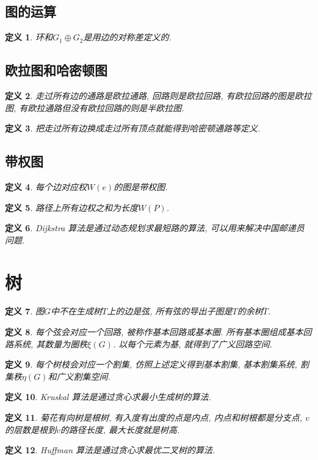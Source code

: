 \documentclass[UTF8,a4paper,11pt]{ctexart}
\newtheorem{definition}{定义}
\begin{document}
    \subsection{图的运算}
      \begin{definition}
        环和$G_1\oplus G_2$是用边的对称差定义的.
      \end{definition}
    \subsection{欧拉图和哈密顿图}
      \begin{definition}
        走过所有边的通路是欧拉通路,
        回路则是欧拉回路,
        有欧拉回路的图是欧拉图,
        有欧拉通路但没有欧拉回路的则是半欧拉图.
      \end{definition}
      \begin{definition}
        把走过所有边换成走过所有顶点就能得到哈密顿通路等定义.
      \end{definition}
    \subsection{带权图}
      \begin{definition}
        每个边对应权$W\left(e\right)$的图是带权图.
      \end{definition}
      \begin{definition}
        路径上所有边权之和为长度$W\left(P\right)$.
      \end{definition}
      \begin{definition}
        Dijkstra 算法是通过动态规划求最短路的算法,
        可以用来解决中国邮递员问题.
      \end{definition}
  \section{树}
    \begin{definition}
      图$G$中不在生成树$T$上的边是弦,
      所有弦的导出子图是$T$的余树$\overline{T}$.
    \end{definition}
    \begin{definition}
      每个弦会对应一个回路, 被称作基本回路或基本圈.
      所有基本圈组成基本回路系统, 其数量为圈秩$\xi\left(G\right)$.
      以每个元素为基, 就得到了广义回路空间.
    \end{definition}
    \begin{definition}
      每个树枝会对应一个割集, 仿照上述定义得到基本割集,
      基本割集系统, 割集秩$\eta\left(G\right)$和广义割集空间.
    \end{definition}
    \begin{definition}
      Kruskal 算法是通过贪心求最小生成树的算法.
    \end{definition}
    \begin{definition}
      菊花有向树是根树,
      有入度有出度的点是内点,
      内点和树根都是分支点,
      $v$的层数是根到$v$的路径长度,
      最大长度就是树高.
    \end{definition}
    \begin{definition}
      Huffman 算法是通过贪心求最优二叉树的算法.
    \end{definition}
\end{document}
